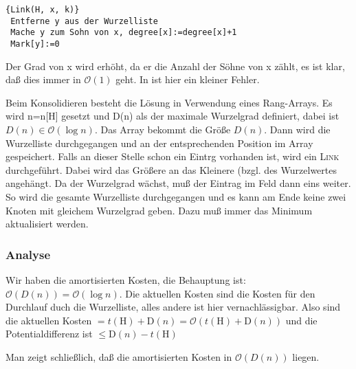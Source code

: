 \documentclass[ngerman,draft,parskip=half*,twoside]{scrreprt}
\theoremstyle{break}
\theoremstyle{nonumberbreak}
\newcommand*{\OO}{\mathcal{O}}      %
\begin{document}
\begin{Algorithmus}[H]
\begin{lstlisting}[frame=tlrb, mathescape=true, title=\textsc{Link\textnormal{(H, x, k)}}, gobble=1]{Link(H, x, k)}
 Entferne y aus der Wurzelliste
 Mache y zum Sohn von x, degree[x]:=degree[x]+1
 Mark[y]:=0
\end{lstlisting}
Der Grad von x wird erhöht, da er die Anzahl der Söhne von x zählt, es ist klar, daß dies immer in $\OO(1)$ geht. In
\cite{ottmann} ist hier ein kleiner Fehler.
\end{Algorithmus}

Beim Konsolidieren besteht die Lösung in Verwendung eines Rang-Arrays.
Es wird n=n[H] gesetzt und D(n) als der maximale Wurzelgrad definiert, dabei ist $D(n)\in\OO(\log n)$. Das Array bekommt 
die Größe $D(n)$. Dann wird die Wurzelliste durchgegangen und an der entsprechenden Position im Array gespeichert. Falls
an dieser Stelle schon ein Eintrg vorhanden ist, wird ein \textsc{Link} durchgeführt. Dabei wird das Größere an das
Kleinere (bzgl. des Wurzelwertes angehängt. Da der Wurzelgrad wächst, muß der Eintrag
im Feld dann eins weiter. So wird die gesamte Wurzelliste durchgegangen und es kann am Ende keine zwei Knoten mit
gleichem Wurzelgrad geben. Dazu muß immer das Minimum aktualisiert werden.

\subsubsection{Analyse}
Wir haben die amortisierten Kosten, die Behauptung ist: $\OO(D(n))=\OO(\log n)$. Die aktuellen Kosten sind die Kosten für den
Durchlauf duch die Wurzelliste, alles andere ist hier vernachlässigbar. Also sind die aktuellen Kosten
$=t(\mbox{H})+\mbox{D}(n)=\OO(t(\mbox{H})+\mbox{D}(n))$ und die Potentialdifferenz ist $\leq
\mbox{D}(n)-t(\mbox{H})$

Man zeigt schließlich, daß die amortisierten Kosten in $\OO(D(n))$ liegen.
\end{document}

